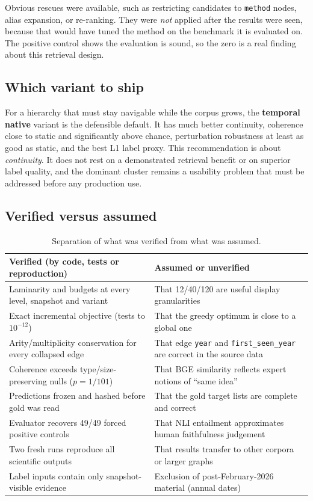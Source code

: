 \documentclass[11pt,a4paper]{article}
\theoremstyle{remark}
\newcommand{\code}[1]{\texttt{\small #1}}
\begin{document}
Obvious rescues were available, such as restricting candidates to \code{method} nodes, alias
expansion, or re-ranking. They were \emph{not} applied after the results were seen, because
that would have tuned the method on the benchmark it is evaluated on. The positive control shows
the evaluation is sound, so the zero is a real finding about this retrieval design.

\subsection{Which variant to ship}

For a hierarchy that must stay navigable while the corpus grows, the \textbf{temporal native}
variant is the defensible default. It has much better continuity, coherence close to static and
significantly above chance, perturbation robustness at least as good as static, and the best L1
label proxy. This recommendation is about \emph{continuity}. It does not rest on a demonstrated
retrieval benefit or on superior label quality, and the dominant cluster remains a usability
problem that must be addressed before any production use.

\subsection{Verified versus assumed}

\begin{table}[!htbp]
\centering
\caption{Separation of what was verified from what was assumed.}
\label{tab:verified}
\small
\begin{tabularx}{\linewidth}{XX}
\toprule
Verified (by code, tests or reproduction) & Assumed or unverified\\
\midrule
Laminarity and budgets at every level, snapshot and variant &
That 12/40/120 are useful display granularities\\
Exact incremental objective (tests to $10^{-12}$) &
That the greedy optimum is close to a global one\\
Arity/multiplicity conservation for every collapsed edge &
That edge \code{year} and \code{first\_seen\_year} are correct in the source data\\
Coherence exceeds type/size-preserving nulls ($p=1/101$) &
That BGE similarity reflects expert notions of ``same idea''\\
Predictions frozen and hashed before gold was read &
That the gold target lists are complete and correct\\
Evaluator recovers 49/49 forced positive controls &
That NLI entailment approximates human faithfulness judgement\\
Two fresh runs reproduce all scientific outputs &
That results transfer to other corpora or larger graphs\\
Label inputs contain only snapshot-visible evidence &
Exclusion of post-February-2026 material (annual dates)\\
\bottomrule
\end{tabularx}
\end{table}
\end{document}
